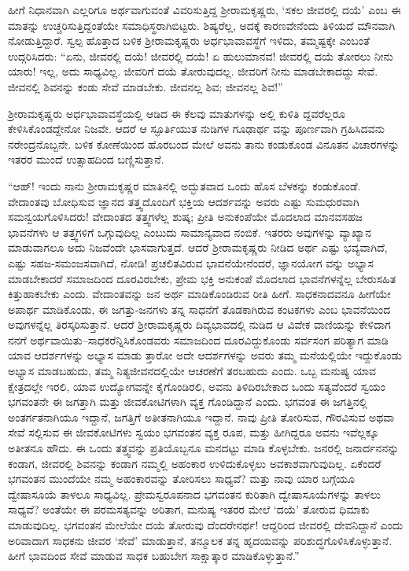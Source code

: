 ಹೀಗೆ ನಿಧಾನವಾಗಿ ಎಲ್ಲರಿಗೂ ಅರ್ಥವಾಗುವಂತೆ ವಿವರಿಸುತ್ತಿದ್ದ ಶ್ರೀರಾಮಕೃಷ್ಣರು, ‘ಸಕಲ ಜೀವರಲ್ಲಿ ದಯೆ’ ಎಂಬ ಈ ಮಾತನ್ನು ಉಚ್ಚರಿಸುತ್ತಿದ್ದಂತೆಯೇ ಸಮಾಧಿಸ್ಥರಾಗಿಬಿಟ್ಟರು. ಶಿಷ್ಯರೆಲ್ಲ, ಅದಕ್ಕೆ ಕಾರಣವೇನೆಂದು ತಿಳಿಯದೆ ಮೌನವಾಗಿ ನೋಡುತ್ತಿದ್ದಾರೆ. ಸ್ವಲ್ಪ ಹೊತ್ತಾದ ಬಳಿಕ ಶ್ರೀರಾಮಕೃಷ್ಣರು ಅರ್ಧಭಾವಾವಸ್ಥೆಗೆ ಇಳಿದು, ತಮ್ಮಷ್ಟಕ್ಕೇ ಎಂಬಂತೆ ಉದ್ಗರಿಸಿದರು: “ಏನು, ಜೀವರಲ್ಲಿ ದಯೆ! ಜೀವರಲ್ಲಿ ದಯೆ! ಏ ಹುಲುಮಾನವ! ಜೀವರಲ್ಲಿ ದಯೆ ತೋರಲು ನೀನು ಯಾರು! ಇಲ್ಲ, ಅದು ಸಾಧ್ಯವಿಲ್ಲ. ಜೀವರಿಗೆ ದಯೆ ತೋರುವುದಲ್ಲ. ಜೀವರಿಗೆ ನೀನು ಮಾಡಬೇಕಾದದ್ದು ಸೇವೆ. ಜೀವನಲ್ಲಿ ಶಿವನನ್ನು ಕಂಡು ಸೇವೆ ಮಾಡಬೇಕು. ಜೀವನಲ್ಲ ಶಿವ; ಜೀವನಲ್ಲ ಶಿವ!”

ಶ್ರೀರಾಮಕೃಷ್ಣರು ಅರ್ಧಭಾವಾವಸ್ಥೆಯಲ್ಲಿ ಆಡಿದ ಈ ಕೆಲವು ಮಾತುಗಳನ್ನು ಅಲ್ಲಿ ಕುಳಿತಿ ದ್ದವರೆಲ್ಲರೂ ಕೇಳಿಸಿಕೊಂಡದ್ದೇನೋ ನಿಜವೇ. ಆದರೆ ಆ ಸ್ಫೂರ್ತಿಯುತ ನುಡಿಗಳ ಗೂಢಾರ್ಥ ವನ್ನು ಪೂರ್ಣವಾಗಿ ಗ್ರಹಿಸಿದವನು ನರೇಂದ್ರನೊಬ್ಬನೇ. ಬಳಿಕ ಕೋಣೆಯಿಂದ ಹೊರಬಂದ ಮೇಲೆ ಅವನು ತಾನು ಕಂಡುಕೊಂಡ ವಿನೂತನ ವಿಚಾರಗಳನ್ನು ಇತರರ ಮುಂದೆ ಉತ್ಸಾಹದಿಂದ ಬಣ್ಣಿಸುತ್ತಾನೆ.

“ಆಹ್! ಇಂದು ನಾನು ಶ್ರೀರಾಮಕೃಷ್ಣರ ಮಾತಿನಲ್ಲಿ ಅದ್ಭುತವಾದ ಒಂದು ಹೊಸ ಬೆಳಕನ್ನು ಕಂಡುಕೊಂಡೆ. ವೇದಾಂತವು ಬೋಧಿಸುವ ಜ್ಞಾನದ ತತ್ತ್ವದೊಂದಿಗೆ ಭಕ್ತಿಯ ಆದರ್ಶವನ್ನು ಅವರು ಎಷ್ಟು ಸುಮಧುರವಾಗಿ ಸಮನ್ವಯಗೊಳಿಸಿದರು! ವೇದಾಂತದ ತತ್ತ್ವಗಳೆಲ್ಲ ಶುಷ್ಕ; ಪ್ರೀತಿ ಅನುಕಂಪೆಯೇ ಮೊದಲಾದ ಮಾನವಸಹಜ ಭಾವನೆಗಳು ಆ ತತ್ತ್ವಗಳಿಗೆ ಒಗ್ಗುವುದಿಲ್ಲ ಎಂಬುದು ಸಾಮಾನ್ಯವಾದ ನಂಬಿಕೆ. ಇತರರು ಅವುಗಳನ್ನು ವ್ಯಾಖ್ಯಾನ ಮಾಡುವಾಗಲೂ ಅದು ನಿಜವೆಂದೇ ಭಾಸವಾಗುತ್ತದೆ. ಆದರೆ ಶ್ರೀರಾಮಕೃಷ್ಣರು ನೀಡಿದ ಅರ್ಥ ಎಷ್ಟು ಭವ್ಯವಾಗಿದೆ, ಎಷ್ಟು ಸಹಜ-ಸಮಂಜಸವಾಗಿದೆ, ನೋಡಿ! ಪ್ರಚಲಿತವಿರುವ ಭಾವನೆಯೇನೆಂದರೆ, ಜ್ಞಾನಯೋಗ ವನ್ನು ಅಭ್ಯಾಸ ಮಾಡಬೇಕಾದರೆ ಸಮಾಜದಿಂದ ದೂರವಿರಬೇಕು, ಪ್ರೇಮ ಭಕ್ತಿ ಅನುಕಂಪೆ ಮೊದಲಾದ ಭಾವನೆಗಳನ್ನೆಲ್ಲ ಬೇರುಸಹಿತ ಕಿತ್ತುಹಾಕಬೇಕು ಎಂದು. ವೇದಾಂತವನ್ನು ಜನ ಅರ್ಥ ಮಾಡಿಕೊಂಡಿರುವ ರೀತಿ ಹೀಗೆ. ಸಾಧಕನಾದವನೂ ಹೀಗೆಯೇ ಅಪಾರ್ಥ ಮಾಡಿಕೊಂಡು, ಈ ಜಗತ್ತು-ಜನಗಳು ತನ್ನ ಸಾಧನೆಗೆ ತೊಡಕಾಗಿರುವ ಕಂಟಕಗಳು ಎಂಬ ಭಾವನೆಯಿಂದ ಅವುಗಳನ್ನೆಲ್ಲ ತಿರಸ್ಕರಿಸುತ್ತಾನೆ. ಆದರೆ ಶ್ರೀರಾಮಕೃಷ್ಣರು ದಿವ್ಯಭಾವದಲ್ಲಿ ನುಡಿದ ಆ ವಿವೇಕ ವಾಣಿಯನ್ನು ಕೇಳಿದಾಗ ನನಗೆ ಅರ್ಥವಾಯಿತು–ಸಾಧಕರೆನ್ನಿಸಿಕೊಂಡವರು ಸಮಾಜದಿಂದ ದೂರವಿದ್ದುಕೊಂಡು ಸರ್ವಸಂಗ ಪರಿತ್ಯಾಗ ಮಾಡಿ ಯಾವ ಆದರ್ಶಗಳನ್ನು ಅಭ್ಯಾಸ ಮಾಡು ತ್ತಾರೋ ಅದೇ ಆದರ್ಶಗಳನ್ನು ಅವರು ತಮ್ಮ ಮನೆಯಲ್ಲಿಯೇ ಇದ್ದುಕೊಂಡು ಅಭ್ಯಾಸ ಮಾಡಬಹುದು, ತಮ್ಮ ನಿತ್ಯಜೀವನದಲ್ಲಿಯೇ ಆಚರಣೆಗೆ ತರಬಹುದು ಎಂದು. ಒಬ್ಬ ಮನುಷ್ಯ ಯಾವ ಕ್ಷೇತ್ರದಲ್ಲೇ ಇರಲಿ, ಯಾವ ಉದ್ಯೋಗವನ್ನೇ ಕೈಗೊಂಡಿರಲಿ, ಅವನು ತಿಳಿದಿರಬೇಕಾದ ಒಂದು ಸತ್ಯವೆಂದರೆ ಸ್ವಯಂ ಭಗವಂತನೇ ಈ ಜಗತ್ತಾಗಿ ಮತ್ತು ಜೀವಕೋಟಿಗಳಾಗಿ ವ್ಯಕ್ತ ಗೊಂಡಿದ್ದಾನೆ ಎಂದು. ಭಗವಂತ ಈ ಜಗತ್ತಿನಲ್ಲಿ ಅಂತರ್ಗತನಾಗಿಯೂ ಇದ್ದಾನೆ, ಜಗತ್ತಿಗೆ ಅತೀತನಾಗಿಯೂ ಇದ್ದಾನೆ. ನಾವು ಪ್ರೀತಿ ತೋರಿಸುವ, ಗೌರವಿಸುವ ಅಥವಾ ಸೇವೆ ಸಲ್ಲಿಸುವ ಈ ಜೀವಕೋಟಿಗಳು ಸ್ವಯಂ ಭಗವಂತನ ವ್ಯಕ್ತ ರೂಪ, ಮತ್ತು ಹೀಗಿದ್ದರೂ ಅವನು ಇವೆಲ್ಲಕ್ಕೂ ಅತೀತನೂ ಹೌದು. ಈ ಒಂದು ತತ್ತ್ವವನ್ನು ಪ್ರತಿಯೊಬ್ಬನೂ ಮನದಟ್ಟು ಮಾಡಿ ಕೊಳ್ಳಬೇಕು. ಜನರಲ್ಲಿ ಜನಾರ್ದನನನ್ನು ಕಂಡಾಗ, ಜೀವರಲ್ಲಿ ಶಿವನನ್ನು ಕಂಡಾಗ ನಮ್ಮಲ್ಲಿ ಅಹಂಕಾರ ಉಳಿದುಕೊಳ್ಳಲು ಅವಕಾಶವಾಗುವುದಿಲ್ಲ. ಏಕೆಂದರೆ ಭಗವಂತನ ಮುಂದೆಯೇ ನಮ್ಮ ಅಹಂಕಾರವನ್ನು ತೋರಿಸಲು ಸಾಧ್ಯವೆ? ಮತ್ತು ನಾವು ಯಾರ ಬಗ್ಗೆಯೂ ದ್ವೇಷಾಸೂಯೆ ತಾಳಲೂ ಸಾಧ್ಯವಿಲ್ಲ. ಪ್ರೇಮಸ್ವರೂಪನಾದ ಭಗವಂತನ ಕುರಿತಾಗಿ ದ್ವೇಷಾಸೂಯೆಗಳನ್ನು ತಾಳಲು ಸಾಧ್ಯವೆ? ಅಂತೆಯೇ ಈ ಪರಮಸತ್ಯವನ್ನು ಅರಿತಾಗ, ಮನುಷ್ಯ ಇತರರ ಮೇಲೆ ‘ದಯೆ’ ತೋರುವ ಧಿಮಾಕು ಮಾಡುವುದಿಲ್ಲ. ಭಗವಂತನ ಮೇಲೆಯೇ ದಯೆ ತೋರುವು ದೆಂದರೇನರ್ಥ! ಆದ್ದರಿಂದ ಜೀವರಲ್ಲಿ ದೇವನಿದ್ದಾನೆ ಎಂದು ಅರಿವಾದಾಗ ಸಾಧಕನು ಜೀವರ ‘ಸೇವೆ’ ಮಾಡುತ್ತಾನೆ, ತನ್ಮೂಲಕ ತನ್ನ ಹೃದಯವನ್ನು ಪರಿಶುದ್ಧಗೊಳಿಸಿಕೊಳ್ಳುತ್ತಾನೆ. ಹೀಗೆ ಭಾವದಿಂದ ಸೇವೆ ಮಾಡುವ ಸಾಧಕ ಬಹುಬೇಗ ಸಾಕ್ಷಾತ್ಕಾರ ಮಾಡಿಕೊಳ್ಳುತ್ತಾನೆ.”

